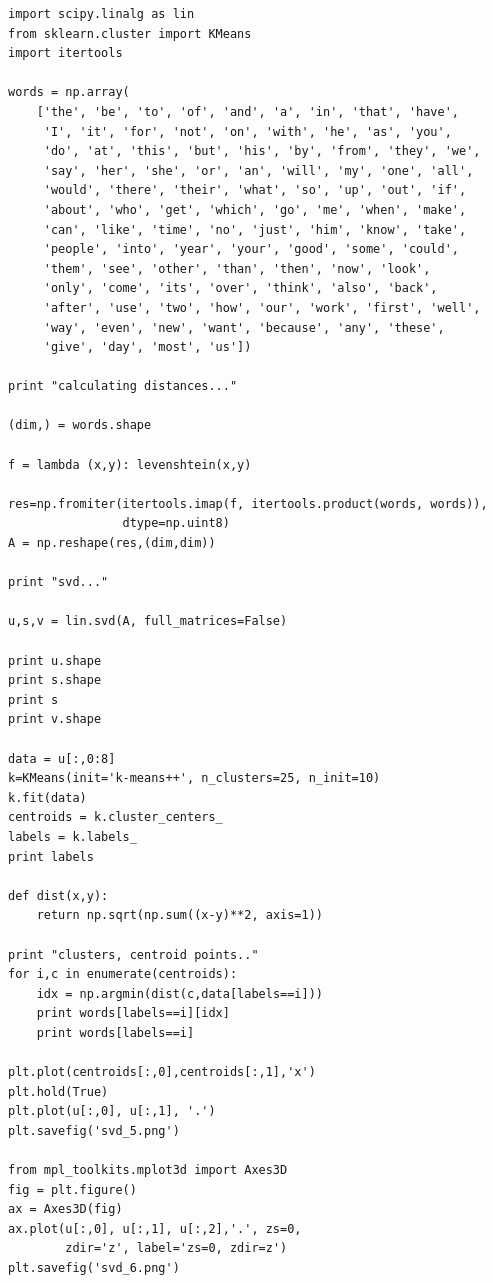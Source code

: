 \documentclass[12pt,fleqn]{article}\usepackage{../common}
\begin{document}
\begin{verbatim}
import scipy.linalg as lin
from sklearn.cluster import KMeans
import itertools

words = np.array(
    ['the', 'be', 'to', 'of', 'and', 'a', 'in', 'that', 'have',
     'I', 'it', 'for', 'not', 'on', 'with', 'he', 'as', 'you',
     'do', 'at', 'this', 'but', 'his', 'by', 'from', 'they', 'we',
     'say', 'her', 'she', 'or', 'an', 'will', 'my', 'one', 'all',
     'would', 'there', 'their', 'what', 'so', 'up', 'out', 'if',
     'about', 'who', 'get', 'which', 'go', 'me', 'when', 'make',
     'can', 'like', 'time', 'no', 'just', 'him', 'know', 'take',
     'people', 'into', 'year', 'your', 'good', 'some', 'could',
     'them', 'see', 'other', 'than', 'then', 'now', 'look',
     'only', 'come', 'its', 'over', 'think', 'also', 'back',
     'after', 'use', 'two', 'how', 'our', 'work', 'first', 'well',
     'way', 'even', 'new', 'want', 'because', 'any', 'these',
     'give', 'day', 'most', 'us'])

print "calculating distances..."

(dim,) = words.shape

f = lambda (x,y): levenshtein(x,y)

res=np.fromiter(itertools.imap(f, itertools.product(words, words)),
                dtype=np.uint8)
A = np.reshape(res,(dim,dim))

print "svd..."

u,s,v = lin.svd(A, full_matrices=False)

print u.shape
print s.shape
print s
print v.shape

data = u[:,0:8]
k=KMeans(init='k-means++', n_clusters=25, n_init=10)
k.fit(data)
centroids = k.cluster_centers_
labels = k.labels_
print labels

def dist(x,y):   
    return np.sqrt(np.sum((x-y)**2, axis=1))
    
print "clusters, centroid points.."
for i,c in enumerate(centroids):
    idx = np.argmin(dist(c,data[labels==i]))
    print words[labels==i][idx]
    print words[labels==i]
    
plt.plot(centroids[:,0],centroids[:,1],'x')
plt.hold(True)
plt.plot(u[:,0], u[:,1], '.')
plt.savefig('svd_5.png')

from mpl_toolkits.mplot3d import Axes3D
fig = plt.figure()
ax = Axes3D(fig)
ax.plot(u[:,0], u[:,1], u[:,2],'.', zs=0,
        zdir='z', label='zs=0, zdir=z')
plt.savefig('svd_6.png')
\end{verbatim}
\end{document}
